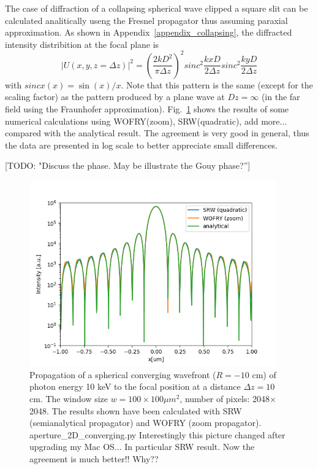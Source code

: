 \documentclass{iucr}              %
\newcommand{\todo}[1]{{\color{red}[TODO: "#1'']}}
\newcommand{\inred}[1]{{\color{red}#1}}
\newcommand{\ingreen}[1]{{\color{green}#1}}
\begin{document}
The case of diffraction of a collapsing spherical wave clipped a square slit can be calculated analitically useng the Fresnel propagator thus assuming paraxial approximation. As shown in Appendix~\ref{appendix_collapsing}, the diffracted intensity distribition at the focal plane is
\begin{equation}
    |U(x,y,z=\Delta z)|^2 = \left( \frac{2 k D^2}{\pi \Delta z}\right)^2 sinc^2\frac{k x D}{2 \Delta z} sinc^2\frac{k y D}{2 \Delta z}
\end{equation}
with $sinc x(x)=\sin(x)/x$. Note that this pattern is the same (except for the scaling factor) as the pattern produced by a plane wave at $Dz=\infty$ (in the far field using the Fraunhofer approximation). Fig.~\ref{fig: slit 2D converging} shows the results of some numerical calculations using WOFRY(zoom), SRW(quadratic), \inred{add more...} compared with the analytical result. The agreement is very good in general, thus the data are presented in log scale to better appreciate small differences.  

\todo{Discuss the phase. May be illustrate the Gouy phase?}

\begin{figure}
\label{fig: slit 2D converging}
\caption{Propagation of a spherical converging wavefront ($R=-10$ cm) of photon energy 10 keV to the focal position at a distance $\Delta z = 10$ cm. The window size $w=100 \times 100 \mu m^2$, number of pixels: 2048$\times$2048. The results shown have been calculated with SRW (semianalytical propagator) and WOFRY (zoom propagator). \ingreen{aperture\_2D\_converging.py} \inred{Interestingly this picture changed after upgrading my Mac OS... In particular SRW result. Now the agreement is much better!! Why??}
}
\includegraphics[width=0.95\textwidth]{aperture_2D_converging.png}
\end{figure}
\end{document}
